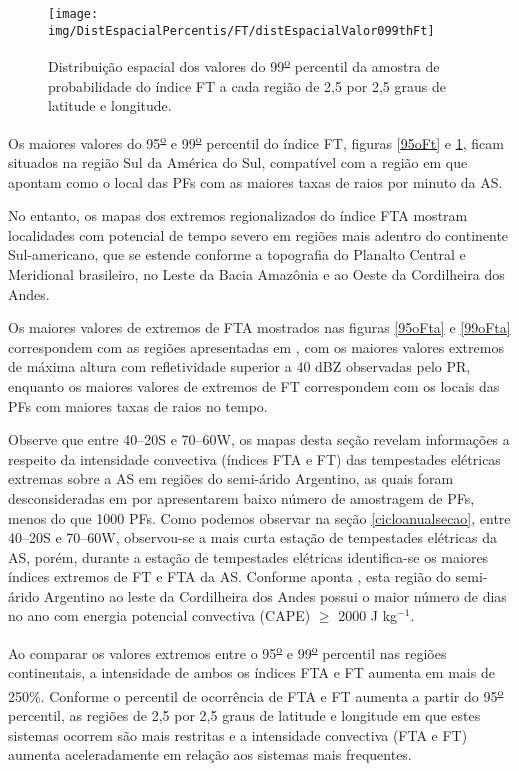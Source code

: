 \begin{figure}[!ht]
\centering  
{\texttt{[image: img/DistEspacialPercentis/FT/distEspacialValor099thFt]}}
\caption{Distribuição espacial dos valores do  99\textsuperscript{\underline{o}} percentil da amostra de probabilidade do índice FT a cada região de 2,5 por 2,5 graus de latitude e longitude.}
\label{99oFt}
\end{figure}

Os maiores valores do 95\textsuperscript{\underline{o}} e 99\textsuperscript{\underline{o}} percentil do índice FT, figuras \ref{95oFt} e \ref{99oFt},  ficam situados na região Sul da América do Sul, compatível com a região em que  apontam como o local das PFs com as maiores taxas de raios por minuto da AS.

No entanto, os mapas dos extremos regionalizados do índice FTA mostram localidades com potencial de tempo severo em regiões mais adentro do continente Sul-americano, que se estende conforme a topografia do Planalto Central e Meridional brasileiro, no Leste da Bacia Amazônia e ao Oeste da Cordilheira dos Andes. 

Os maiores valores de extremos de FTA mostrados nas figuras \ref{95oFta} e \ref{99oFta} correspondem com as regiões apresentadas em , com os maiores valores extremos de máxima altura com refletividade superior a 40 dBZ observadas pelo PR, enquanto os maiores valores de extremos de FT correspondem com os locais das PFs com maiores taxas de raios no tempo.

Observe que entre 40--20S e 70--60W, os mapas desta seção revelam informações a respeito da intensidade convectiva (índices FTA e FT) das tempestades elétricas extremas sobre a AS em regiões do semi-árido Argentino, as quais foram desconsideradas em  por apresentarem baixo número de amostragem de PFs, menos do que 1000 PFs. Como podemos observar na seção \ref{cicloanualsecao}, entre 40--20S e 70--60W, observou-se a mais curta estação de tempestades elétricas da AS, porém, durante a estação de tempestades elétricas identifica-se os maiores índices extremos de FT e FTA da AS. Conforme aponta , esta região do semi-árido Argentino ao leste da Cordilheira dos Andes possui o maior número de dias no ano com energia potencial convectiva (CAPE) $\geq$ 2000 J kg$^{-1}$. 


Ao comparar os valores extremos entre o 95\textsuperscript{\underline{o}} e 99\textsuperscript{\underline{o}} percentil nas regiões continentais, a intensidade de ambos os índices FTA e FT aumenta em mais de 250\%. Conforme o percentil de ocorrência de FTA e FT aumenta a partir do 95\textsuperscript{\underline{o}} percentil, as regiões de 2,5 por 2,5 graus de latitude e longitude em que estes sistemas ocorrem são mais restritas e a intensidade convectiva (FTA e FT) aumenta aceleradamente em relação aos sistemas mais frequentes.
